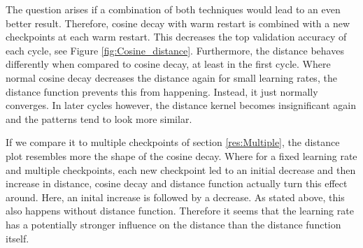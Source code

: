 The question arises if a combination of both techniques would lead to an even
better result. Therefore, cosine decay with warm restart is combined with a new
checkpoints at each warm restart. This decreases the top validation accuracy of
each cycle, see Figure \ref{fig:Cosine_distance}. Furthermore, the distance
behaves differently when compared to cosine decay, at least in the first cycle.
Where normal cosine decay decreases the distance again for small learning rates,
the distance function prevents this from happening. Instead, it just normally
converges. In later cycles however, the distance kernel becomes insignificant
again and the patterns tend to look more similar.

If we compare it to multiple checkpoints of section \ref{res:Multiple}, the
distance plot resembles more the shape of the cosine decay. Where for a fixed
learning rate and multiple checkpoints, each new checkpoint led to an initial
decrease and then increase in distance, cosine decay and distance function
actually turn this effect around. Here, an inital increase is followed by a
decrease. As stated above, this also happens without distance function.
Therefore it seems that the learning rate has a potentially stronger influence
on the distance than the distance function itself.
\pagebreak



